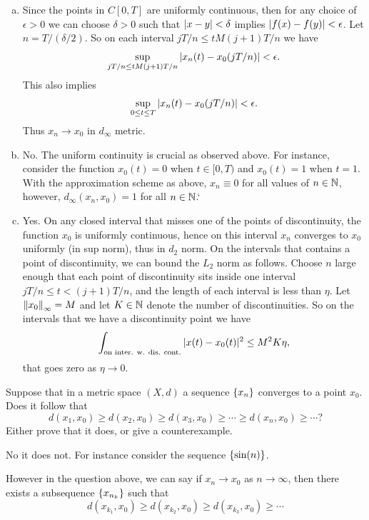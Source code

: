 \begin{solution}
	\begin{enumerate}[(a)]
		\item Since the points in $ C[0,T] $ are uniformly continuous, then for any choice of $ \epsilon>0 $ we can choose $ \delta>0 $ such that $ |x-y|<\delta $ implies $ |f(x)-f(y)|<\epsilon $. Let $ n = T/(\delta/2) $. So on each interval $ jT/n \leq t M (j+1)T/n $ we have 
		\[ \sup_{jT/n \leq t M (j+1)T/n} |x_n(t) - x_0(jT/n)| < \epsilon. \]
		This also implies
		\[  \sup_{0\leq t\leq T} |x_n(t) - x_0(jT/n)| < \epsilon. \]
		Thus $ x_n \to x_0 $ in $ d_\infty $ metric.
		
		\item No. The uniform continuity is crucial as observed above. For instance, consider the function $ x_0(t) = 0 $ when $ t\in [0,T) $ and $ x_0(t) = 1 $ when $ t=1 $. With the approximation scheme as above, $ x_n \equiv 0 $ for all values of $ n\in \mathbb{N} $, however, $ d_\infty (x_n,x_0) = 1 $ for all $ n\in \mathbb{N} $.`
		
		\item Yes. On any closed interval that misses one of the points of discontinuity, the function $ x_0 $ is uniformly continuous, hence on this interval $ x_n $ converges to $ x_0 $ uniformly (in sup norm), thus in $ d_2 $ norm. On the intervals that contains a point of discontinuity, we can bound the $ L_2 $ norm as follows. Choose $ n $ large enough that each point of discontinuity sits inside one interval $ jT/n \leq t < (j+1)T/n $, and the length of each interval is less than $ \eta $. Let $ \norm{x_0}_\infty = M $ and let $ K\in \mathbb{N} $ denote the number of discontinuities. So on the intervals that we have a discontinuity point we have
		\[ \int_{\text{on inter. w. dis. cont.}} |x(t)-x_0(t)|^2 \leq M^2 K \eta, \]
		that goes zero as $ \eta\to 0 $.
	\end{enumerate}
\end{solution}

\begin{problem}
	Suppose that in a metric space $ (X,d) $ a sequence $ \{x_n\} $ converges to a point $ x_0 $. Does it follow that
	\[ d(x_1,x_0) \geq d(x_2,x_0) \geq d(x_3,x_0) \geq \cdots \geq d(x_n,x_0) \geq \cdots ? \]
	Either prove that it does, or give a counterexample.
\end{problem}
\begin{solution}
	No it does not. For instance consider the sequence $ \{\sin(n)\} $.
\end{solution}
\begin{remark}
	However in the question above, we can say if $ x_n\to x_0 $ as $ n\to\infty $, then there exists a subsequence $ \{x_{n_k}\} $ such that
	\[ d(x_{k_1},x_0) \geq d(x_{k_2},x_0) \geq d(x_{k_3},x_0) \geq \cdots   \]
\end{remark}


